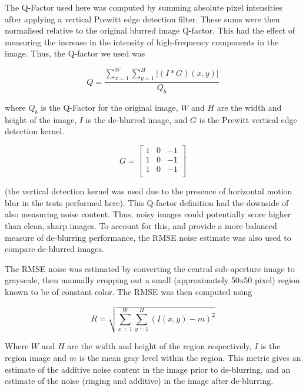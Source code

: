 The Q-Factor used here was computed by summing absolute pixel intensities after applying a vertical Prewitt edge detection filter.
These sums were then normalised relative to the original blurred image Q-factor.
This had the effect of measuring the increase in the intensity of high-frequency components in the image.
Thus, the Q-factor we used was

\begin{equation}
Q = \frac{\sum_{x=1}^{W} \sum_{y=1}^{H}
\left| (I \ast G)(x, y) \right|
\label{eq:q_factor}}{Q_b}
\end{equation}

where $Q_b$ is the Q-Factor for the original image, $W$ and $H$ are the width and height of the image, $I$ is the de-blurred image, and $G$ is the Prewitt vertical edge detection kernel.

\begin{equation}
G = 
\begin{bmatrix}
1 & 0 & -1 \\
1 & 0 & -1 \\
1 & 0 & -1 \\
\end{bmatrix}
\label{eq:prewitt_filter}
\end{equation}

(the vertical detection kernel was used due to the presence of horizontal motion blur in the tests performed here).
This Q-factor definition had the downside of also measuring noise content.
Thus, noisy images could potentially score higher than clean, sharp images.
To account for this, and provide a more balanced measure of de-blurring performance, the RMSE noise estimate was also used to compare de-blurred images.

The RMSE noise was estimated by converting the central sub-aperture image to grayscale, then manually cropping out a small (approximately 50x50 pixel) region known to be of constant color.
The RMSE was then computed using

\begin{equation}
R = \sqrt{ \sum_{x=1}^{W} \sum_{y=1}^{H} (I(x,y) - m)^2 }
\end{equation}

Where $W$ and $H$ are the width and height of the region respectively, $I$ is the region image and $m$ is the mean gray level within the region.
This metric gives an estimate of the additive noise content in the image prior to de-blurring, and an estimate of the noise (ringing and additive) in the image after de-blurring.

